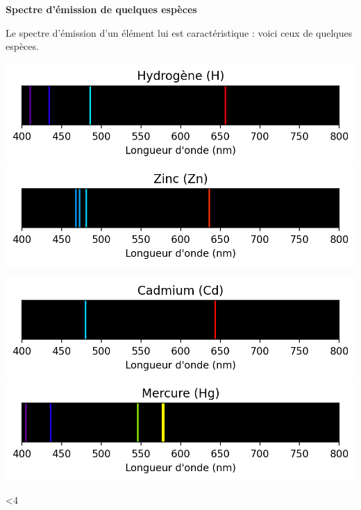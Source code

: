 \documentclass[12pt,a4paper,fleqn]{article}
\begin{document}
\setcounter{int}{1}
\loop

\begin{doc}
\textbf{Spectre d'émission de quelques espèces}

Le spectre d'émission d'un élément lui est caractéristique : voici ceux de quelques espèces.
\begin{center}
\includegraphics[width=.49\linewidth]{images/spectrum_H.png}
\hfill
\includegraphics[width=.49\linewidth]{images/spectrum_Zn.png}

\includegraphics[width=.49\linewidth]{images/spectrum_Cd.png}
\hfill
\includegraphics[width=.49\linewidth]{images/spectrum_Hg.png}
\end{center}
\end{doc}

\addtocounter{int}{1}
\ifnum \value{int}<4
\repeat
\end{document}
